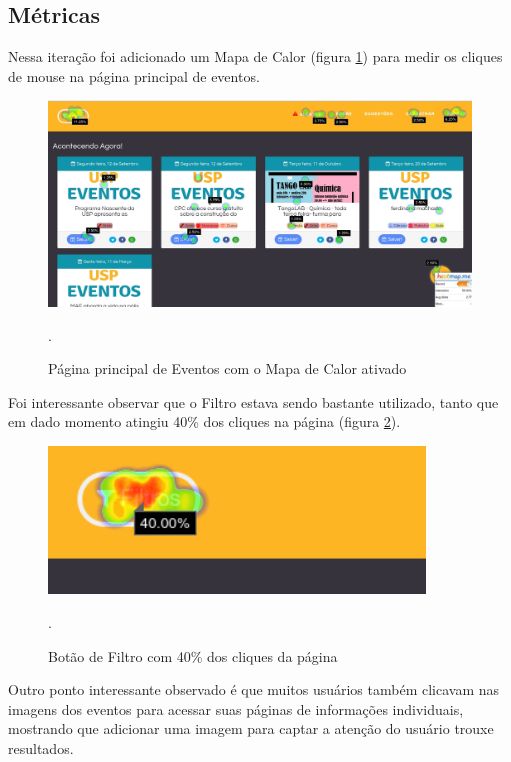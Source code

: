 \subsection{Métricas}

\par Nessa iteração foi adicionado um Mapa de Calor (figura \ref{fig:heatmap}) para medir os cliques de mouse na página principal de eventos.
\begin{figure}[htb]
\centering
\includegraphics[width=15cm]{figuras/heatmap}
\caption{\label{fig:heatmap} Página principal de Eventos com o Mapa de Calor ativado}.
\end{figure}

\par Foi interessante observar que o Filtro estava sendo bastante utilizado, tanto que em dado momento atingiu 40\% dos cliques na página (figura \ref{fig:heatmap_filter}).
\begin{figure}[htb]
\centering
\includegraphics[width=10cm]{figuras/heatmap_filter}
\caption{\label{fig:heatmap_filter} Botão de Filtro com 40\% dos cliques da página}.
\end{figure}

\par Outro ponto interessante observado é que muitos usuários também clicavam nas imagens dos eventos para acessar suas páginas de informações individuais, mostrando que adicionar uma imagem para captar a atenção do usuário trouxe resultados.

